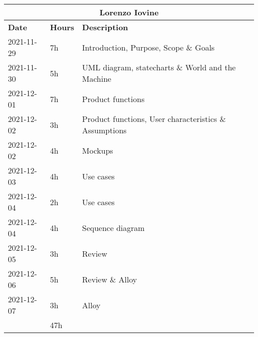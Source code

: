 \begin{table}[H]
    \centering
    \begin{tabular}{|l|l|l|}
        \multicolumn{3}{c}{\textbf{Lorenzo Iovine}}                   \\
        \hline
        \textbf{Date} & \textbf{Hours} & \textbf{Description}          \\\hline
        2021-11-29    & 7h             & Introduction, Purpose, Scope \& Goals                  \\\hline
        2021-11-30    & 5h             & UML diagram, statecharts \& World and the Machine      \\\hline
        2021-12-01    & 7h             & Product functions                                      \\\hline
        2021-12-02    & 3h             & Product functions, User characteristics \& Assumptions \\\hline
        2021-12-02    & 4h             & Mockups                                                \\\hline
        2021-12-03    & 4h             & Use cases                                              \\\hline
        2021-12-04    & 2h             & Use cases                                              \\\hline
        2021-12-04    & 4h             & Sequence diagram                                       \\\hline
        2021-12-05    & 3h             & Review                                                 \\\hline
        2021-12-06    & 5h             & Review \& Alloy                                        \\\hline
        2021-12-07    & 3h             & Alloy                                                  \\\hline\hline
                      & 47h            &                                                        \\\hline
    \end{tabular}
\end{table}
